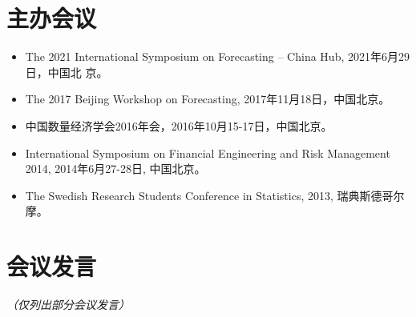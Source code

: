 \documentclass[twoside,a4paper,10pt]{amsart}
\begin{document}
\section*{主办会议}

\begin{itemize}

\item The 2021 International Symposium on Forecasting -- China Hub, 2021年6月29日，中国北
  京。

\item  The 2017 Beijing Workshop on Forecasting, 2017年11月18日，中国北京。
\item 中国数量经济学会2016年会，2016年10月15-17日，中国北京。

\item International Symposium on Financial Engineering and Risk Management 2014,
  2014年6月27-28日, 中国北京。

\item The Swedish Research Students Conference in Statistics, 2013, 瑞典斯德哥尔摩。
\end{itemize}

\section*{会议发言}

\emph{（仅列出部分会议发言）}
\end{document}
